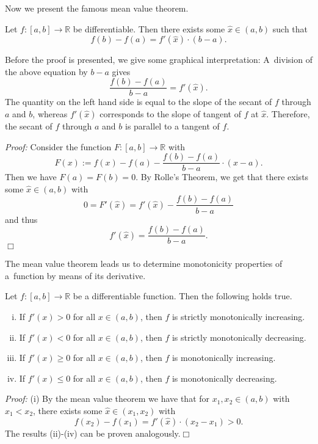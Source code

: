 

Now we present the famous mean value theorem.
\begin{Theorem}{}
Let $f:[a,b]\to\mathbb{R}$ be differentiable. Then there exists some $\hat{x}\in(a,b)$ such that
\[f(b)-f(a)=f'(\hat{x})\cdot (b-a).\]
\end{Theorem}
Before the proof is presented, we give some graphical interpretation: A~division of the above equation by $b-a$ gives
\[\frac{f(b)-f(a)}{b-a}=f'(\hat{x}).\]
The quantity on the left hand side is equal to the slope of the secant of $f$ through $a$ and $b$, whereas $f'(\hat{x})$ corresponds to the slope of tangent of $f$ at $\hat{x}$. Therefore,
the secant of $f$ through $a$ and $b$ is parallel to a tangent of $f$.


{\em Proof:} Consider the function $F:[a,b]\to\mathbb{R}$ with
\[F(x):=f(x)-f(a)-\frac{f(b)-f(a)}{b-a}\cdot(x-a).\]
Then we have $F(a)=F(b)=0$. By Rolle's Theorem, we get that there exists some $\hat{x}\in(a,b)$ with
\[0=F'(\hat{x})=f'(\hat{x})-\frac{f(b)-f(a)}{b-a}\]
and thus
\[f'(\hat{x})=\frac{f(b)-f(a)}{b-a}.\]
\hfill$\Box$

The mean value theorem leads us to determine monotonicity properties of a~function by means of its derivative.
\begin{Theorem}{}
    Let $f:[a,b]\to\mathbb{R}$ be a differentiable function. Then the following holds true.
\begin{enumerate}[(i)]
 \item If $f'(x)>0$ for all $x\in(a,b)$, then $f$ is strictly monotonically increasing.
 \item If $f'(x)<0$ for all $x\in(a,b)$, then $f$ is strictly monotonically decreasing.
 \item If $f'(x)\geq0$ for all $x\in(a,b)$, then $f$ is monotonically increasing.
 \item If $f'(x)\leq0$ for all $x\in(a,b)$, then $f$ is monotonically decreasing.
\end{enumerate}
\end{Theorem}
{\em Proof:}
(i) By the mean value theorem we have that for $x_1,x_2\in(a,b)$ with $x_1<x_2$, there exists some $\hat{x}\in(x_1,x_2)$ with
\[f(x_2)-f(x_1)=f'(\hat{x})\cdot(x_2-x_1)>0.\]
The results (ii)-(iv) can be proven analogously.\hfill$\Box$

